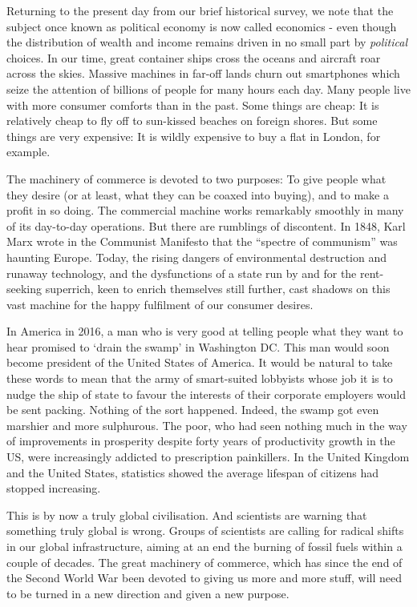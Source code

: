 \documentclass[]{tufte-handout}
\begin{document}
Returning to the present day from our brief historical survey, we note
that the subject once known as political economy is now called economics
- even though the distribution of wealth and income remains driven in no
small part by \emph{political} choices. In our time, great container
ships cross the oceans and aircraft roar across the skies. Massive
machines in far-off lands churn out smartphones which seize the
attention of billions of people for many hours each day. Many people
live with more consumer comforts than in the past. Some things are
cheap: It is relatively cheap to fly off to sun-kissed beaches on
foreign shores. But some things are very expensive: It is wildly
expensive to buy a flat in London, for example.

The machinery of commerce is devoted to two purposes: To give people
what they desire (or at least, what they can be coaxed into buying), and
to make a profit in so doing. The commercial machine works remarkably
smoothly in many of its day-to-day operations. But there are rumblings
of discontent. In 1848, Karl Marx wrote in the Communist Manifesto that
the ``spectre of communism'' was haunting Europe. Today, the rising
dangers of environmental destruction and runaway technology, and the
dysfunctions of a state run by and for the rent-seeking superrich, keen
to enrich themselves still further, cast shadows on this vast machine
for the happy fulfilment of our consumer desires.

In America in 2016, a man who is very good at telling people what they
want to hear promised to `drain the swamp' in Washington DC. This man
would soon become president of the United States of America. It would be
natural to take these words to mean that the army of smart-suited
lobbyists whose job it is to nudge the ship of state to favour the
interests of their corporate employers would be sent packing. Nothing of
the sort happened. Indeed, the swamp got even marshier and more
sulphurous. The poor, who had seen nothing much in the way of
improvements in prosperity despite forty years of productivity growth in
the US, were increasingly addicted to prescription painkillers. In the
United Kingdom and the United States, statistics showed the average
lifespan of citizens had stopped increasing.

This is by now a truly global civilisation. And scientists are warning
that something truly global is wrong. Groups of scientists are calling
for radical shifts in our global infrastructure, aiming at an end the
burning of fossil fuels within a couple of decades. The great machinery
of commerce, which has since the end of the Second World War been
devoted to giving us more and more stuff, will need to be turned in a
new direction and given a new purpose.
\end{document}
